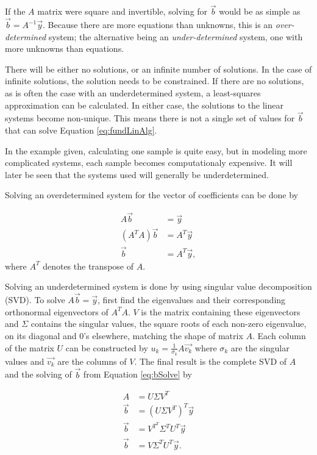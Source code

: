 \par If the $A$ matrix were square and invertible, solving for $\vec{b}$ would be as simple as $\vec{b} = A^{-1}\vec{y}$. Because there are more equations than unknowns, this is an \textit{over-determined} system; the alternative being an \textit{under-determined} system, one with more unknowns than equations.
\par There will be either no solutions, or an infinite number of solutions. In the case of infinite solutions, the solution needs to be constrained. If there are no solutions, as is often the case with an underdetermined system, a least-squares approximation can be calculated. In either case, the solutions to the linear systems become non-unique. This means there is not a single set of values for $\vec{b}$ that can solve Equation \ref{eq:fundLinAlg}.
\par In the example given, calculating one sample is quite easy, but in modeling more complicated systems, each sample becomes computationaly expensive. It will later be seen that the systems used will generally be underdetermined.
\par Solving an overdetermined system for the vector of coefficients can be done by 

\begin{align}
A\vec{b} &= \vec{y} \\
(A^TA)\vec{b} &= A^T\vec{y} \\
\vec{b} &= A^T\vec{y}, \label{eq:bSolve}
\end{align}
where $A^T$ denotes the transpose of $A$.

\par Solving an underdetermined system is done by using singular value decomposition (SVD)\cite{linAlg-book}. To solve $A\vec{b}=\vec{y}$, first find the eigenvalues and their corresponding orthonormal eigenvectors of $A^TA$. $V$ is the matrix containing these eigenvectors and $\Sigma$ contains the singular values, the square roots of each non-zero eigenvalue, on its diagonal and $0$'s elsewhere, matching the shape of matrix $A$. Each column of the matrix $U$ can be constructed by $u_k=\frac{1}{\sigma_k}A\vec{v_k}$ where $\sigma_k$ are the singular values and $\vec{v_k}$ are the columns of $V$. The final result is the complete SVD of $A$ and the solving of $\vec{b}$ from Equation \ref{eq:bSolve} by

\begin{align}
A & =U\Sigma V^T \\
\vec{b} &= (U\Sigma V^T)^T\vec{y} \\
\vec{b} &= V^{T^T}\Sigma^TU^T\vec{y} \\
\vec{b} &= V\Sigma^TU^T\vec{y}.
\end{align}

